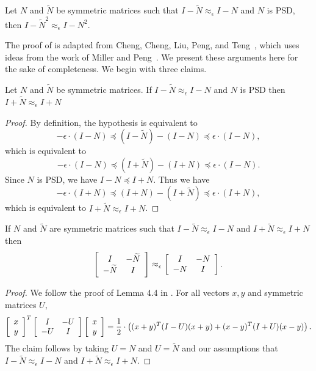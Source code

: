 \documentclass{toc}
\newcommand{\wt}{\widetilde}   %
\numberwithin{myalgctr}{section}
\theoremstyle{named}
\begin{document}
\begin{lemma}
\label{lem:sq}
Let $N$ and $\wt{N}$ be symmetric matrices such that $I-\wt{N}\approx_{\epsilon} I-N$ and $N$ is PSD, then $I-\wt{N}^2 \approx_{\epsilon} I-N^2$.
\end{lemma}
The proof of  is adapted from Cheng, Cheng, Liu, Peng, and Teng~\cite{cheng2015}, which uses ideas from the work of Miller and Peng~\cite{miller2013approximate}. We present these arguments here for the sake of completeness. We begin with three claims.
\begin{claim}
\label{claim1}
Let $N$ and $\wt{N}$ be symmetric matrices. If $I-\wt{N}\approx_{\epsilon}I-N$ and $N$ is PSD then $I+\wt{N}\approx_{\epsilon}I+N$
\end{claim}
\begin{proof}
By definition, the hypothesis is equivalent to 
\[
-\epsilon\cdot (I-N)\preceq(I-\wt{N})-(I-N)\preceq \epsilon\cdot(I-N),
\]
which is equivalent to 
\[
-\epsilon\cdot (I-N)\preceq(I+\wt{N})-(I+N)\preceq \epsilon\cdot(I-N).
\]
Since $N$ is PSD, we have $I-N\preceq I+N$. Thus we have
\[
-\epsilon\cdot(I+N)\preceq (I+N)-(I+\wt{N})\preceq\epsilon\cdot (I+N),
\]
which is equivalent to $I+\wt{N}\approx_{\epsilon}I+N$.
\end{proof}
\begin{claim}
\label{claim2}
If $N$ and $\wt{N}$ are symmetric matrices such that $I-\wt{N}\approx_{\epsilon}I-N$ and $I+\wt{N}\approx_{\epsilon}I+N$ then
\[
\left[
\begin{array}{c c}
I & -\wt{N} \\
-\wt{N} & I
\end{array}
\right] \approx_{\epsilon}\left[
\begin{array}{c c}
I & -N \\
-N & I
\end{array}
\right].
\]
\end{claim}
\begin{proof}
We follow the proof of Lemma 4.4 in \cite{cheng2015}. For all vectors $x,y$ and symmetric matrices $U$, 
\[
\left[
\begin{array}{c}
x \\
y
\end{array}\right]^{T}\left[
\begin{array}{c c}
I & -U \\
-U & I
\end{array}
\right]\left[
\begin{array}{c}
x \\
y
\end{array}\right] = \frac{1}{2}\cdot\left((x+y)^{T}(I-U)(x+y) + (x-y)^T(I+U)(x-y) \right).
\]
The claim follows by taking $U=N$ and $U=\wt{N}$ and our assumptions that $I-\wt{N}\approx_{\epsilon}I-N$ and $I+\wt{N}\approx_{\epsilon}I+N$.
\end{proof}
\end{document}
